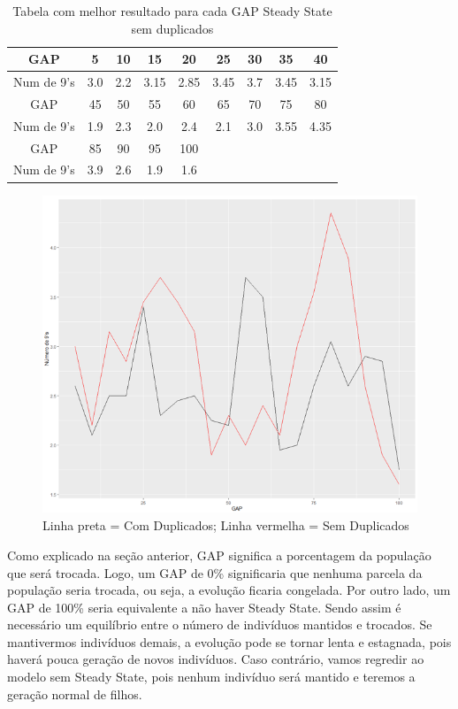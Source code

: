 \documentclass[12pt]{article}
\begin{document}
\begin{table}[H]
	\centering
	\begin{tabular}{|c|c|c|c|c|c|c|c|c|}
		\hline
		GAP & 5 & 10 & 15 & 20 & 25 & 30 & 35 & 40 \\
		\hline
		Num de 9's &3.0  &2.2  &3.15  &2.85  &3.45  &3.7  &3.45  &3.15  \\
		\hline
		GAP & 45 & 50 & 55 & 60 & 65 & 70 & 75 & 80 \\
		\hline
		Num de 9's &1.9  &2.3  &2.0  &2.4  &2.1 &3.0  &3.55  &4.35  \\
		\hline
		GAP & 85 & 90 & 95 & 100 &  &  &  &  \\
		\hline
		Num de 9's &3.9  &2.6  &1.9  &1.6  &  &  &  &  \\
		\hline
	\end{tabular}
	\caption{Tabela com melhor resultado para cada GAP Steady State sem duplicados}
\end{table}

\begin{figure}[H]
	\centering
	\includegraphics[width=0.7\linewidth]{Imagens/comparacaoGAP}
	\caption{Linha preta = Com Duplicados; Linha vermelha = Sem Duplicados}
	\label{fig:comparacaogap}
\end{figure}


Como explicado na seção anterior, GAP significa a porcentagem da população que será trocada. Logo, um GAP de 0\% significaria que nenhuma parcela da população seria trocada, ou seja, a evolução ficaria congelada. Por outro lado, um GAP de 100\% seria equivalente a não haver Steady State. Sendo assim é necessário um equilíbrio entre o número de indivíduos mantidos e trocados. Se mantivermos indivíduos demais, a evolução pode se tornar lenta e estagnada, pois haverá pouca geração de novos indivíduos. Caso contrário, vamos regredir ao modelo sem Steady State, pois nenhum indivíduo será mantido e teremos a geração normal de filhos.
\end{document}

